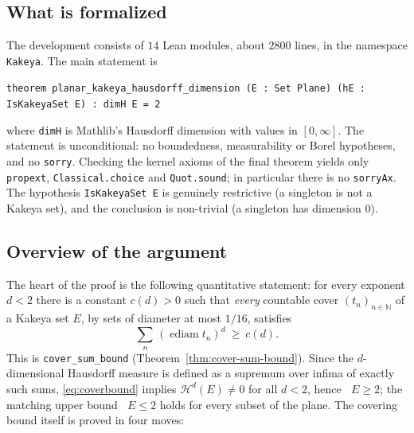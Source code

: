 \documentclass[11pt,a4paper]{article}
\newcommand{\N}{\mathbb{N}}
\newcommand{\ennr}{\ensuremath{[0,\infty]}}          %
\DeclareMathOperator{\ediam}{ediam}
\DeclareMathOperator{\Hdim}{dim_H}
\newcommand{\HM}[1]{\mathcal{H}^{#1}}                %
\newcommand{\lname}[1]{\texttt{#1}}                  %
\theoremstyle{definition}
\theoremstyle{remark}
\begin{document}
\subsection{What is formalized}

The development consists of $14$ Lean modules, about $2800$ lines, in the namespace
\lname{Kakeya}.  The main statement is

\begin{center}
\lname{theorem planar\_kakeya\_hausdorff\_dimension (E : Set Plane)
        (hE : IsKakeyaSet E) : dimH E = 2}
\end{center}

\noindent
where \lname{dimH} is Mathlib's Hausdorff dimension with values in $\ennr$.  The statement
is unconditional: no boundedness, measurability or Borel hypotheses, and no \lname{sorry}.
Checking the kernel axioms of the final theorem yields only \lname{propext},
\lname{Classical.choice} and \lname{Quot.sound}; in particular there is no
\lname{sorryAx}.  The hypothesis \lname{IsKakeyaSet E} is genuinely restrictive (a
singleton is not a Kakeya set), and the conclusion is non-trivial (a singleton has
dimension $0$).

\subsection{Overview of the argument}

The heart of the proof is the following quantitative statement: for every exponent $d<2$
there is a constant $c(d)>0$ such that \emph{every} countable cover
$(t_n)_{n\in\N}$ of a Kakeya set $E$, by sets of diameter at most $1/16$, satisfies
\begin{equation}\label{eq:coverbound}
  \sum_{n}\, (\ediam t_n)^{d}\ \ge\ c(d).
\end{equation}
This is \lname{cover\_sum\_bound} (Theorem~\ref{thm:cover-sum-bound}).  Since the
$d$-dimensional Hausdorff measure is defined as a supremum over infima of exactly such
sums, \eqref{eq:coverbound} implies $\HM{d}(E)\neq 0$ for all $d<2$, hence
$\Hdim E \ge 2$; the matching upper bound $\Hdim E\le 2$ holds for every subset of the
plane.  The covering bound itself is proved in four moves:
\end{document}

